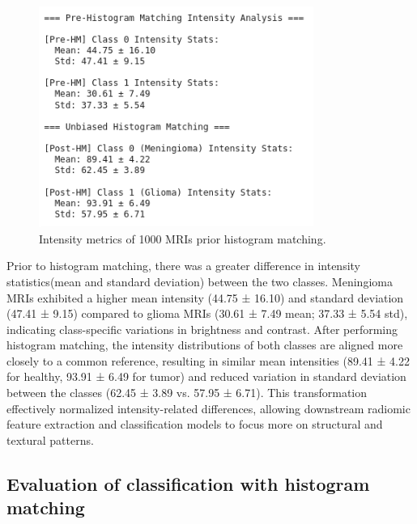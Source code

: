 \documentclass[11pt,a4paper]{article}
\begin{document}
		\begin{figure}[H]
			\centering
			\includegraphics[width=0.8\textwidth]{images/pre_hm_stats.png}
			\caption{Intensity metrics of 1000 MRIs prior histogram matching.}
			\label{fig1:}
		\end{figure}		

Prior to histogram matching, there was a greater difference in intensity statistics(mean and standard deviation)
between the two classes. 
Meningioma MRIs exhibited a higher mean intensity (44.75 ± 16.10) and 
standard deviation (47.41 ± 9.15) compared to glioma MRIs (30.61 ± 7.49 mean; 37.33 ± 5.54 std), 
indicating class-specific variations in brightness and contrast. 
After performing histogram matching, the intensity distributions of both classes are aligned more closely 
to a common reference, resulting in similar mean intensities (89.41 ± 4.22 for healthy, 93.91 ± 6.49 for tumor) 
and reduced variation in standard deviation between the classes (62.45 ± 3.89 vs. 57.95 ± 6.71). 
This transformation effectively normalized intensity-related differences, allowing downstream radiomic feature 
extraction and classification models to focus more on structural and textural patterns.


\subsection{Evaluation of classification with histogram matching}
\end{document}
